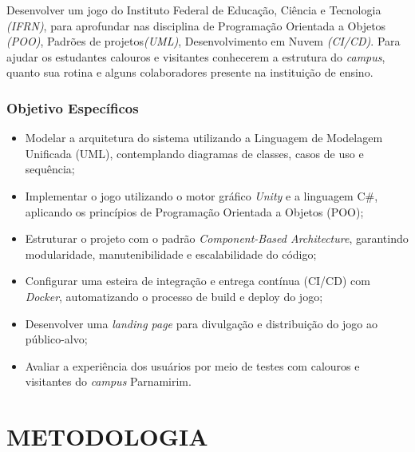 \documentclass[12pt, a4paper]{article}
\begin{document}
Desenvolver um jogo do Instituto Federal de Educação, Ciência e Tecnologia \textit{(IFRN)},
para aprofundar nas disciplina de Programação Orientada a Objetos\textit{ (POO)}, Padrões de projetos\textit{(UML)}, 
Desenvolvimento em Nuvem\textit{ (CI/CD)}. Para ajudar os estudantes calouros e visitantes conhecerem a estrutura do 
\textit{campus}, quanto sua rotina e alguns colaboradores presente na instituição de ensino. 

\newpage

\subsubsection{Objetivo Específicos}

\begin{itemize}
    \item Modelar a arquitetura do sistema utilizando a Linguagem de Modelagem
    Unificada (UML), contemplando diagramas de classes, casos de uso e sequência;

    \item Implementar o jogo utilizando o motor gráfico \textit{Unity} e a linguagem
    C\#, aplicando os princípios de Programação Orientada a Objetos (POO);

    \item Estruturar o projeto com o padrão \textit{Component-Based Architecture},
    garantindo modularidade, manutenibilidade e escalabilidade do código;

    \item Configurar uma esteira de integração e entrega contínua (CI/CD) com
    \textit{Docker}, automatizando o processo de build e deploy do jogo;

    \item Desenvolver uma \textit{landing page} para divulgação e distribuição
    do jogo ao público-alvo;

    \item Avaliar a experiência dos usuários por meio de testes com calouros e
    visitantes do \textit{campus} Parnamirim.
\end{itemize}


\newpage

\section{METODOLOGIA}
\end{document}
